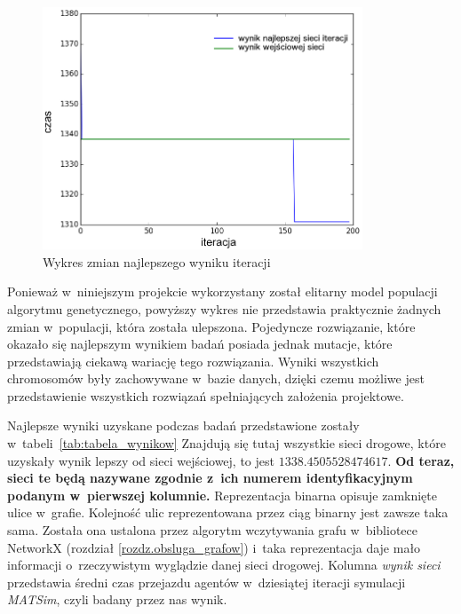 \documentclass[twoside,12pt]{report}
\begin{document}
\begin{figure}[htbp]
	\centering
	\includegraphics[width=0.85\textwidth]{img/fitness}
	\caption{Wykres zmian najlepszego wyniku iteracji}
	\label{fig:wynik_globalny}
\end{figure}

Ponieważ w~niniejszym projekcie wykorzystany został elitarny model populacji algorytmu genetycznego, powyższy wykres nie przedstawia praktycznie żadnych zmian w~populacji, która została ulepszona. Pojedyncze rozwiązanie, które okazało się najlepszym wynikiem badań posiada jednak  mutacje, które przedstawiają ciekawą wariację tego rozwiązania. Wyniki wszystkich chromosomów były  zachowywane w~bazie danych, dzięki czemu możliwe jest przedstawienie wszystkich rozwiązań spełniających założenia projektowe.

Najlepsze wyniki uzyskane podczas badań przedstawione zostały w~tabeli~\ref{tab:tabela_wynikow} Znajdują się tutaj wszystkie sieci drogowe, które uzyskały wynik lepszy od sieci wejściowej, to jest $1338.4505528474617$. \textbf{Od teraz, sieci te będą nazywane zgodnie z~ich numerem identyfikacyjnym podanym w~pierwszej kolumnie.} Reprezentacja binarna opisuje zamknięte ulice w~grafie. Kolejność ulic reprezentowana przez ciąg binarny jest zawsze taka sama. Została ona ustalona przez algorytm wczytywania grafu w~bibliotece NetworkX (rozdział \ref{rozdz.obsluga_grafow}) i~taka reprezentacja daje mało informacji o~rzeczywistym wyglądzie danej sieci drogowej. Kolumna \textit{wynik sieci} przedstawia średni czas przejazdu agentów w~dziesiątej iteracji symulacji \textit{MATSim}, czyli badany przez nas wynik.
\end{document}
